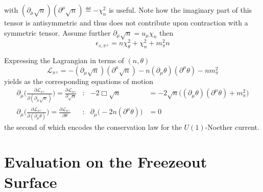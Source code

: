 with $(\partial_\mu\sqrt{n})(\partial^\mu\sqrt{n})\eqdef -\chi_n^2$ is useful. Note how the imaginary part of this tensor is antisymmetric and thus does not contribute upon contraction with a symmetric tensor. Assume further $\partial_\mu\sqrt{n}=u_\mu\chi_n$ then
\begin{equation}
    \epsilon_{s,\pi^\pm}=n\chi_\theta^2+\chi_n^2+m_\pi^2n
\end{equation}

Expressing the Lagrangian in terms of $(n,\theta)$ 
\begin{equation}
    \mathscr{L}_{\pi^\pm}=-(\partial_\mu\sqrt{n})(\partial^\mu\sqrt{n})-n(\partial_\mu\theta)(\partial^\mu\theta)-nm_\pi^2
\end{equation}
yields as the corresponding equations of motion
\begin{subequations}
    \begin{align}
        \partial_\mu\Bigg(\frac{\partial\mathscr{L}_{\pi^\pm}}{\partial(\partial_\mu\sqrt{n})}\Bigg)=\frac{\partial\mathscr{L}_{\pi^\pm}}{\partial\sqrt{n}}&:&-2\Box\sqrt{n}&=-2\sqrt{n}\big((\partial_\mu\theta)(\partial^\mu\theta)+m_\pi^2\big)\\
        \partial_\mu\Bigg(\frac{\partial\mathscr{L}_{\pi^\pm}}{\partial(\partial_\mu\theta)}\Bigg)=\frac{\partial\mathscr{L}_{\pi^\pm}}{\partial\theta}&:&\partial_\mu\big(-2n(\partial^\mu\theta)\big)&=0
    \end{align}
\end{subequations}
the second of which encodes the conservation law for the $U(1)$-Noether current.

\section{Evaluation on the Freezeout Surface}


